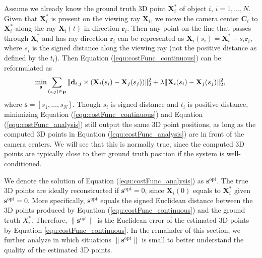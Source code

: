 Assume we already know the ground truth 3D point $\mathbf{{X}}_i^*$ of object $i$, $i=1,\dots,N$. Given that $\mathbf{{X}}_i^*$ is present on the viewing ray $\mathbf{X}_i$, we move the camera center $\mathbf{C}_i$ to $\mathbf{X}_i^*$ along the ray $\mathbf{X}_i(t)$ in direction $\mathbf{r}_i$. Then any point on the line that passes through $\mathbf{X}_i^*$ and has ray direction $\mathbf{r}_i$ can be represented as $\mathbf{X}_i (s_i)= \mathbf{X}_i^* + s_i \mathbf{r}_i$, where $s_i$ is the signed distance along the viewing ray (not the positive distance as defined by the $t_i$). Then Equation (\ref{equ:costFunc_continuous}) can be reformulated as
\begin{equation}
\label{equ:costFunc_analysis}
\underset{\mathbf{s}} { \text{min} }
\sum_{(i,j)\in{\mathbf{p}}}{\|\mathbf{d}_{i,j}\times(\mathbf{X}_i(s_i)-\mathbf{X}_j(s_j))\|_2^2 + \lambda\|\mathbf{X}_i(s_i)-\mathbf{X}_j(s_j)\|_2^2}, \\
\end{equation}
where $\mathbf{s}=[s_1, \dots, s_N]$. Though $s_i$ is signed distance and $t_i$ is positive distance, minimizing Equation (\ref{equ:costFunc_continuous}) and Equation (\ref{equ:costFunc_analysis}) still output the same 3D point positions, as long as the computed 3D points in Equation (\ref{equ:costFunc_analysis}) are in front of the camera centers. We will see that this is normally true, since the computed 3D points are typically close to their ground truth position if the system is well-conditioned.

We denote the solution of Equation (\ref{equ:costFunc_analysis}) as $\mathbf{s}^\text{opt}$. The true 3D points are ideally reconstructed if $\mathbf{s}^\text{opt}=0$, since $\mathbf{X}_i(0)$ equals to $\mathbf{{X}}_i^*$ given $\mathbf{s}^\text{opt}=0$.
More specifically, $\mathbf{s}^\text{opt}$ equals the signed Euclidean distance between the 3D points produced by Equation (\ref{equ:costFunc_continuous}) and the ground truth $X_i^*$.
Therefore, $\|\mathbf{s}^\text{opt}\|$ is the Euclidean error of the estimated 3D points by Equation \ref{equ:costFunc_continuous}.
In the remainder of this section, we further analyze in which situations $\|\mathbf{s}^\text{opt}\|$ is small to better understand the quality of the estimated 3D points. %

